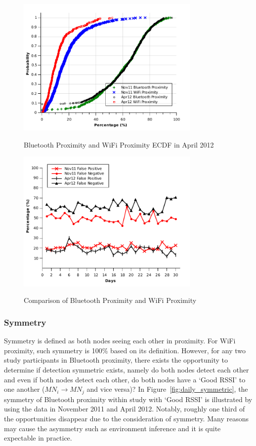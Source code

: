 \begin{figure}[tbp]
\centering 
{\includegraphics[width=3.5in]{graphs/bt_wifi_distribution_201204.pdf}}
\caption{Bluetooth Proximity and WiFi Proximity ECDF in April 2012} 
\label{fig:bt_wifi_distribution}
\end{figure} 

\begin{figure}[tbp]
\centering 
{\includegraphics[width=3.5in]{graphs/wifi_falsenegative.pdf}}
\caption{Comparison of Bluetooth Proximity and WiFi Proximity} 
\label{fig:wifi_fp_fn0}
\end{figure} 

\subsubsection{Symmetry}

Symmetry is defined as both nodes seeing each other in proximity. For WiFi proximity, such symmetry is 100\% based on its definition. However, for any two study participants in Bluetooth proximity, there exists the opportunity to determine if detection symmetric exists, namely do both nodes detect each other and even if both nodes detect each other, do both nodes have a `Good RSSI' to one another ($MN_i \rightarrow MN_j$ and vice versa)? In Figure~\ref{fig:daily_symmetric}, the symmetry of Bluetooth proximity within study with `Good RSSI' is illustrated by using the data in November 2011 and April 2012. Notably, roughly one third of the opportunities disappear due to the consideration of symmetry. Many reasons may cause the asymmetry such as environment inference and it is quite expectable in practice. 

